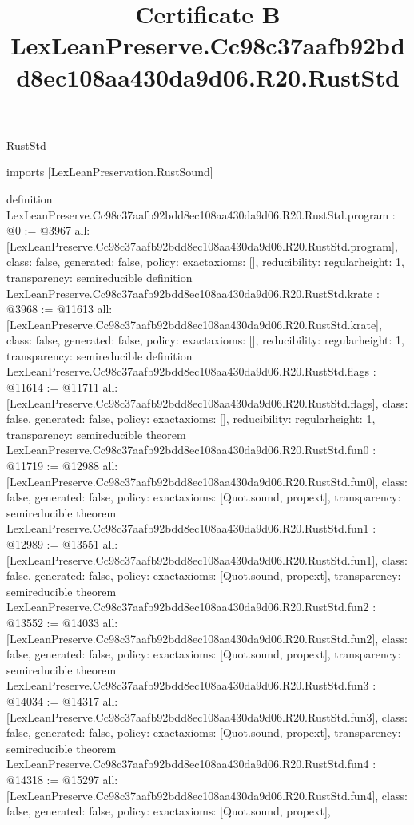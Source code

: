 \begin{lexlean}{RustStd}
\title{Certificate B LexLeanPreserve.Cc98c37aafb92bdd8ec108aa430da9d06.R20.RustStd}
\begin{coremodule}
imports [LexLeanPreservation.RustSound]

definition LexLeanPreserve.Cc98c37aafb92bdd8ec108aa430da9d06.R20.RustStd.program : @0 := @3967 {
  all: [LexLeanPreserve.Cc98c37aafb92bdd8ec108aa430da9d06.R20.RustStd.program],
  class: false,
  generated: false,
  policy: exact{axioms: []},
  reducibility: regular{height: 1},
  transparency: semireducible
}
definition LexLeanPreserve.Cc98c37aafb92bdd8ec108aa430da9d06.R20.RustStd.krate : @3968 := @11613 {
  all: [LexLeanPreserve.Cc98c37aafb92bdd8ec108aa430da9d06.R20.RustStd.krate],
  class: false,
  generated: false,
  policy: exact{axioms: []},
  reducibility: regular{height: 1},
  transparency: semireducible
}
definition LexLeanPreserve.Cc98c37aafb92bdd8ec108aa430da9d06.R20.RustStd.flags : @11614 := @11711 {
  all: [LexLeanPreserve.Cc98c37aafb92bdd8ec108aa430da9d06.R20.RustStd.flags],
  class: false,
  generated: false,
  policy: exact{axioms: []},
  reducibility: regular{height: 1},
  transparency: semireducible
}
theorem LexLeanPreserve.Cc98c37aafb92bdd8ec108aa430da9d06.R20.RustStd.fun0 : @11719 := @12988 {
  all: [LexLeanPreserve.Cc98c37aafb92bdd8ec108aa430da9d06.R20.RustStd.fun0],
  class: false,
  generated: false,
  policy: exact{axioms: [Quot.sound, propext]},
  transparency: semireducible
}
theorem LexLeanPreserve.Cc98c37aafb92bdd8ec108aa430da9d06.R20.RustStd.fun1 : @12989 := @13551 {
  all: [LexLeanPreserve.Cc98c37aafb92bdd8ec108aa430da9d06.R20.RustStd.fun1],
  class: false,
  generated: false,
  policy: exact{axioms: [Quot.sound, propext]},
  transparency: semireducible
}
theorem LexLeanPreserve.Cc98c37aafb92bdd8ec108aa430da9d06.R20.RustStd.fun2 : @13552 := @14033 {
  all: [LexLeanPreserve.Cc98c37aafb92bdd8ec108aa430da9d06.R20.RustStd.fun2],
  class: false,
  generated: false,
  policy: exact{axioms: [Quot.sound, propext]},
  transparency: semireducible
}
theorem LexLeanPreserve.Cc98c37aafb92bdd8ec108aa430da9d06.R20.RustStd.fun3 : @14034 := @14317 {
  all: [LexLeanPreserve.Cc98c37aafb92bdd8ec108aa430da9d06.R20.RustStd.fun3],
  class: false,
  generated: false,
  policy: exact{axioms: [Quot.sound, propext]},
  transparency: semireducible
}
theorem LexLeanPreserve.Cc98c37aafb92bdd8ec108aa430da9d06.R20.RustStd.fun4 : @14318 := @15297 {
  all: [LexLeanPreserve.Cc98c37aafb92bdd8ec108aa430da9d06.R20.RustStd.fun4],
  class: false,
  generated: false,
  policy: exact{axioms: [Quot.sound, propext]},
}
\end{coremodule}
\end{lexlean}
